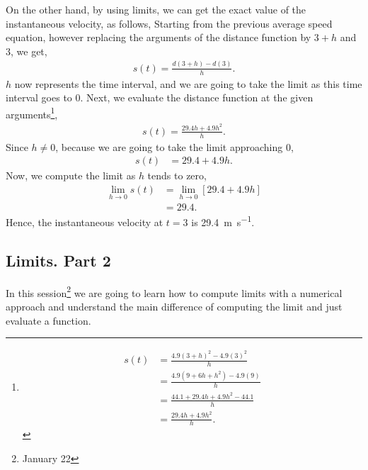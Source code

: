 \documentclass[../main-notes.tex]{subfile}
\begin{document}
On the other hand, by using limits, we can get the exact value of the instantaneous velocity, as follows,
Starting from the previous average speed equation, however replacing the arguments of the distance function by $3+h$ and $3$, we get,
\begin{gather*}
    s(t) = \frac{d(3+h) - d(3)}{h}.
\end{gather*}
$h$ now represents the time interval, and we are going to take the limit as this time interval goes to $0$.
Next, we evaluate the distance function at the given arguments\footnote{
\begin{align*}
    s(t) &= \frac{4.9 (3+h)^2 - 4.9 (3)^2}{h} \\
         &= \frac{4.9 (9+6h+h^2) - 4.9 (9)}{h} \\
         &= \frac{44.1+29.4h+4.9h^2 - 44.1}{h} \\
         &= \frac{29.4h+4.9h^2}{h}. 
\end{align*}
},
\begin{gather*}
    s(t) = \frac{29.4h+4.9h^2}{h}.
\end{gather*}
Since $h\neq0$, because we are going to take the limit approaching $0$,
\begin{align*}
    s(t) &= 29.4+4.9h. 
\end{align*}
Now, we compute the limit as $h$ tends to zero,
\begin{align*}
    \lim_{h\to 0} s(t) &= \lim_{h\to 0}\left[29.4+4.9h\right] \\
                       &= 29.4.
\end{align*}
Hence, the instantaneous velocity at $t=3$ is \SI{29.4}{\meter\per\second}.


\newpage

\subsection{Limits. Part 2}



In this session\footnote{January 22} we are going to learn how to compute limits with a numerical approach and understand the main difference of computing the limit and just evaluate a function.

\end{document}
